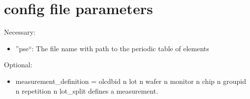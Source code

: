 \documentclass[a4paper,10pt]{article}
\begin{document}
\section{config file parameters}
Necessary:
\begin{itemize}
 \item ''pse``: The file name with path to the periodic table of elements
\end{itemize}
Optional:
\begin{itemize}
 \item measurement\_definition = olcdbid n lot n wafer n monitor n chip n groupid n repetition n lot\_split defines a measurement.
\end{itemize}
\end{document}
